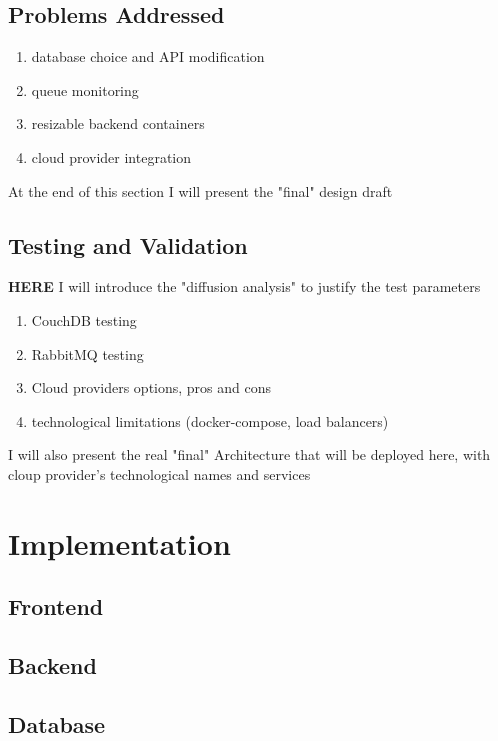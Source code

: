 \documentclass{Configuration_Files/PoliMi3i_thesis}
\begin{document}
		\section{Problems Addressed}
		\label{se:problemaddressed}
			\begin{enumerate}
				\item database choice and API modification
				\item queue monitoring
				\item resizable backend containers
				\item cloud provider integration
			\end{enumerate}
			At the end of this section I will present the "final" design draft
		
		\section{Testing and Validation}
		\label{se:testingvalidation}
			\textbf{HERE} I will introduce the "diffusion analysis" to justify the test parameters
			\begin{enumerate}
				\item CouchDB testing
				\item RabbitMQ testing
				\item Cloud providers options, pros and cons
				\item technological limitations (docker-compose, load balancers)
			\end{enumerate}
			I will also present the real "final" Architecture that will be deployed here, with cloup provider's technological names and services
	
	\chapter{Implementation}
	\label{ch:implementation}

		\section{Frontend}
		\label{se:frontend}

		\section{Backend}
		\label{se:backend}

		\section{Database}
		\label{se:database}
\end{document}
